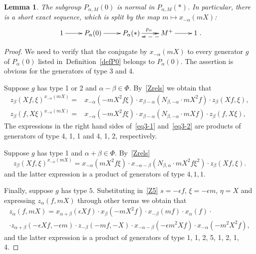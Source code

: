 \documentclass[oneside, 8pt]{amsart}
\newtheorem{lemma}{Lemma}
\theoremstyle{remark}
\theoremstyle{definition}
\numberwithin{lemma}{section}
\numberwithin{prop}{section}
\numberwithin{corollary}{section}
\numberwithin{externaltheorem}{section}
\numberwithin{equation}{section}
\begin{document}
\begin{lemma}\label{P0_normal} The subgroup $P_{\alpha, M}(0)$ is normal in $P_{\alpha, M}(*)$. In particular, there is a short exact sequence, which is split by the map $m \mapsto x_{-\alpha}(mX)$:
\[\xymatrix{1 \ar[r] & P_\alpha(0) \ar[r] & P_\alpha(*) \ar@{->>}[r]^{p_\alpha} & M^+ \ar@<5pt>@{-->}[l] \ar[r] & 1}.\] \end{lemma}
\begin{proof} We need to verify that the conjugate by $x_{-\alpha}(mX)$ to every generator $g$ of $P_\alpha(0)$ listed in~Definition~\ref{defP0} belongs to $P_\alpha(0)$.
The assertion is obvious for the generators of type 3 and 4.

Suppose $g$ has type 1 or 2 and $\alpha - \beta \in \Phi$. By~\cref{Zrels} we obtain that
\begin{align} z_{\beta}(Xf, \xi) ^ {x_{-\alpha}(mX)} = & x_{-\alpha} (- mX^2f\xi) \cdot x_{\beta-\alpha} (N_{\beta, -\alpha}\cdot mX^2f) \cdot z_{\beta}(Xf, \xi), \label{eq3-1} \\
  z_{\beta}(f, X\xi) ^ {x_{-\alpha}(mX)} = & x_{-\alpha} (- mX^2f\xi ) \cdot x_{\beta-\alpha} (N_{\beta, -\alpha}\cdot mXf) \cdot z_{\beta}(f, X\xi), \label{eq3-2} \end{align}
The expressions in the right hand sides of~\eqref{eq3-1} and~\eqref{eq3-2} are products of generators of type 4, 1, 1 and 4, 1, 2, respectively.  

Suppose $g$ has type 1 and  $\alpha + \beta \in \Phi$. By~\cref{Zrels} 
\begin{equation} \label{eq3-3} z_{\beta}(Xf, \xi) ^ {x_{-\alpha}(mX)} = x_{-\alpha} (mX^2f\xi ) \cdot x_{-\alpha-\beta} (N_{\beta,\alpha}\cdot mX^2f\xi^2) \cdot z_{\beta}(Xf, \xi). \end{equation}
and the latter expression is a product of generators of type $4, 1, 1$.

Finally, suppose $g$ has type $5$.
Substituting in~\eqref{Z5} $s = -\epsilon f$, $\xi = -\epsilon m$, $\eta=X$ and expressing $z_\alpha(f, mX)$ through other terms we obtain that
\begin{multline} \label{eq:zalpha} z_\alpha(f, mX) = x_{\alpha+\beta}(\epsilon Xf) \cdot x_{\beta}(-mX^2 f) \cdot x_{-\beta}(mf) \cdot x_\alpha(f) \cdot \\ 
 \cdot z_{\alpha+\beta}(-\epsilon X f, -\epsilon m) \cdot z_{-\beta}(-mf, -X) \cdot x_{-\alpha-\beta}(-\epsilon m^2X f) \cdot x_{-\alpha}(-m^2X^2 f), \end{multline}
and the latter expression is a product of generators of type 1, 1, 2, 5, 1, 2, 1, 4. \end{proof}
\end{document}

